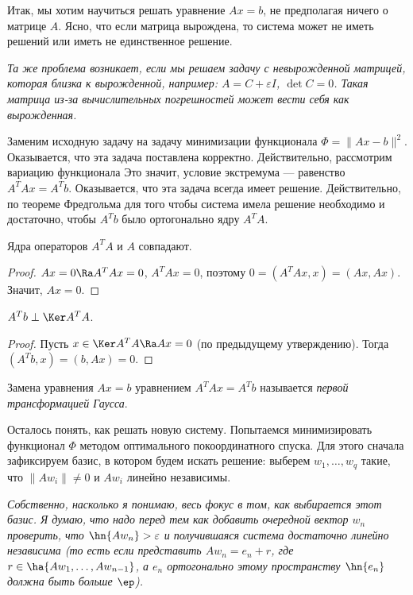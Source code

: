 \documentclass[a4paper]{article}
\begin{document}
Итак, мы хотим научиться решать уравнение $Ax=b$, не предполагая
ничего о матрице $A$. Ясно, что если матрица вырождена, то система
может не иметь решений или иметь не единственное решение.

\textsl{Та же проблема возникает, если мы решаем задачу с
  невырожденной матрицей, которая близка к вырожденной, например:
  $A=C+\varepsilon I$, $\det C=0$. Такая матрица из-за вычислительных
  погрешностей может вести себя как вырожденная.}

Заменим исходную задачу на задачу минимизации функционала
$\Phi=\|Ax-b\|^2$. Оказывается, что эта задача поставлена корректно.
Действительно, рассмотрим вариацию функционала
 Это значит, условие экстремума --- равенство
$A^TAx=A^Tb$. Оказывается, что эта задача всегда имеет
решение. Действительно, по теореме Фредгольма для того чтобы система
имела решение необходимо и достаточно, чтобы $A^Tb$ было ортогонально
ядру $A^TA$.

\begin{stm}
Ядра операторов $A^TA$ и $A$ совпадают.
\end{stm}
\begin{proof}
$Ax=0 \Ra A^TAx=0$, $A^TAx=0$, поэтому $0=(A^TAx,x)=(Ax,Ax)$. Значит,
  $Ax=0$.
\end{proof}

\begin{stm}
$A^Tb \perp \Ker A^TA$.
\end{stm}
\begin{proof}
Пусть $x\in \Ker A^TA \Ra Ax=0$ (по предыдущему утверждению). Тогда
$(A^Tb, x)=(b, Ax)=0$.
\end{proof}

Замена уравнения $Ax=b$ уравнением $A^TAx=A^Tb$ называется
\emph{первой трансформацией Гаусса}.

Осталось понять, как решать новую систему. Попытаемся минимизировать
функционал $\Phi$ методом оптимального покоординатного спуска. Для
этого сначала зафиксируем базис, в котором будем искать решение:
выберем $w_1, \dots, w_q$ такие, что $\|Aw_i\|\ne0$ и $Aw_i$ линейно
независимы.

 \textsl{Собственно, насколько я понимаю, весь фокус в том, как
   выбирается этот базис. Я думаю, что надо перед тем как добавить
   очередной вектор $w_n$ проверить, что $\hn{Aw_n} > \varepsilon$ и
   получившаяся система достаточно линейно независима (то есть если
   представить $Aw_n=e_n+r$, где $r\in \ha{Aw_1,\dots,Aw_{n-1}}$, а
   $e_n$ ортогонально этому пространству $\hn{e_n}$ должна быть больше
   $\ep$).}
\end{document}
